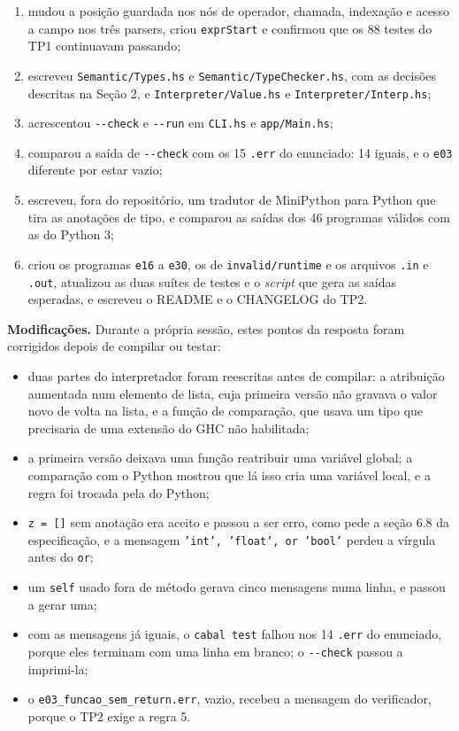 \begin{enumerate}\setlength{\itemsep}{0pt}
\item mudou a posição guardada nos nós de operador, chamada, indexação
  e acesso a campo nos três parsers, criou \texttt{exprStart} e
  confirmou que os 88 testes do TP1 continuavam passando;
\item escreveu \texttt{Semantic/Types.hs} e
  \texttt{Semantic/TypeChecker.hs}, com as decisões descritas na
  Seção 2, e \texttt{Interpreter/Value.hs} e
  \texttt{Interpreter/Interp.hs};
\item acrescentou \texttt{-{}-check} e \texttt{-{}-run} em
  \texttt{CLI.hs} e \texttt{app/Main.hs};
\item comparou a saída de \texttt{-{}-check} com os 15 \texttt{.err}
  do enunciado: 14 iguais, e o \texttt{e03} diferente por estar vazio;
\item escreveu, fora do repositório, um tradutor de MiniPython para
  Python que tira as anotações de tipo, e comparou as saídas dos 46
  programas válidos com as do Python 3;
\item criou os programas \texttt{e16} a \texttt{e30}, os de
  \texttt{invalid/runtime} e os arquivos \texttt{.in} e \texttt{.out},
  atualizou as duas suítes de testes e o \emph{script} que gera as
  saídas esperadas, e escreveu o README e o CHANGELOG do TP2.
\end{enumerate}

\textbf{Modificações.} Durante a própria sessão, estes pontos da
resposta foram corrigidos depois de compilar ou testar:

\begin{itemize}\setlength{\itemsep}{0pt}
\item duas partes do interpretador foram reescritas antes de compilar:
  a atribuição aumentada num elemento de lista, cuja primeira versão
  não gravava o valor novo de volta na lista, e a função de
  comparação, que usava um tipo que precisaria de uma extensão do GHC
  não habilitada;
\item a primeira versão deixava uma função reatribuir uma variável
  global; a comparação com o Python mostrou que lá isso cria uma
  variável local, e a regra foi trocada pela do Python;
\item \texttt{z = []} sem anotação era aceito e passou a ser erro, como
  pede a seção 6.8 da especificação, e a mensagem
  \texttt{'int', 'float', or 'bool'} perdeu a vírgula antes do
  \texttt{or};
\item um \texttt{self} usado fora de método gerava cinco mensagens
  numa linha, e passou a gerar uma;
\item com as mensagens já iguais, o \texttt{cabal test} falhou nos 14
  \texttt{.err} do enunciado, porque eles terminam com uma linha em
  branco; o \texttt{-{}-check} passou a imprimi-la;
\item o \texttt{e03\_funcao\_sem\_return.err}, vazio, recebeu a
  mensagem do verificador, porque o TP2 exige a regra 5.
\end{itemize}

